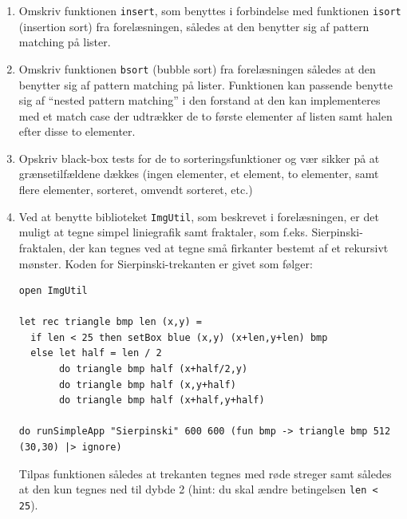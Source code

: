 \documentclass[a4paper,12pt]{article}
\begin{document}
\begin{enumerate}[label=5ø.\arabic*,start=0]
\item Omskriv funktionen \lstinline{insert}, som benyttes i forbindelse
  med funktionen \lstinline{isort} (insertion sort) fra forelæsningen,
  således at den benytter sig af pattern matching på lister.
\item Omskriv funktionen \texttt{bsort} (bubble sort) fra
  forelæsningen således at den benytter sig af pattern matching på
  lister. Funktionen kan passende benytte sig af ``nested pattern
  matching'' i den forstand at den kan implementeres med et match case
  der udtrækker de to første elementer af listen samt halen efter
  disse to elementer.
\item Opskriv black-box tests for de to sorteringsfunktioner og vær
  sikker på at grænsetilfældene dækkes (ingen elementer, et element,
  to elementer, samt flere elementer, sorteret, omvendt sorteret, etc.)

\item\label{sierpinski.ov} Ved at benytte biblioteket \texttt{ImgUtil}, som beskrevet i
  forelæsningen, er det muligt at tegne simpel liniegrafik samt
  fraktaler, som f.eks. Sierpinski-fraktalen, der kan tegnes ved at
  tegne små firkanter bestemt af et rekursivt mønster. Koden for
  Sierpinski-trekanten er givet som følger:

\begin{lstlisting}[numbers=none,frame=none,mathescape]
open ImgUtil

let rec triangle bmp len (x,y) =
  if len < 25 then setBox blue (x,y) (x+len,y+len) bmp
  else let half = len / 2
       do triangle bmp half (x+half/2,y)
       do triangle bmp half (x,y+half)
       do triangle bmp half (x+half,y+half)

do runSimpleApp "Sierpinski" 600 600 (fun bmp -> triangle bmp 512 (30,30) |> ignore)
\end{lstlisting}

Tilpas funktionen således at trekanten tegnes med røde streger samt
således at den kun tegnes ned til dybde 2 (hint: du skal ændre betingelsen \lstinline{len < 25}).


\end{enumerate}
\end{document}
